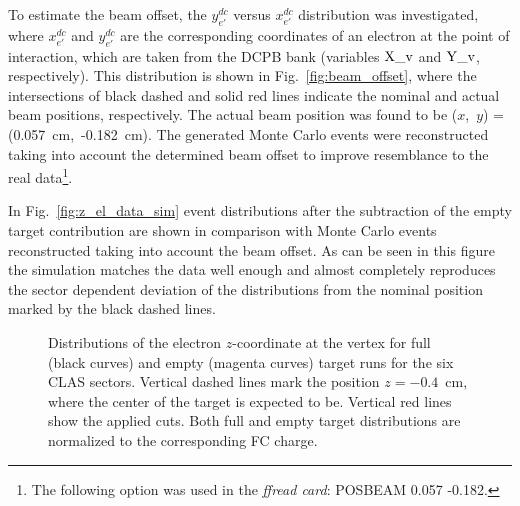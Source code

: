 To estimate the beam offset, the $y_{e'}^{dc}$ versus $x_{e'}^{dc}$ distribution was investigated, where $x_{e'}^{dc}$ and $y_{e'}^{dc}$ are the corresponding coordinates of an electron at the point of interaction, which are taken from the DCPB bank (variables $\rm X\_v$ and $\rm Y\_v$, respectively). This distribution is shown in Fig.~\ref{fig:beam_offset}, where the intersections of black dashed and solid red lines indicate the nominal and actual beam positions, respectively. The actual beam position was found to be ($x$,~$y$) = (0.057~cm,~-0.182~cm). The generated Monte Carlo events were reconstructed taking into account the determined beam offset to improve resemblance to the real data\footnote[7]{The following option was used in the {\em ffread card}: POSBEAM 0.057 -0.182.}.

In Fig.~\ref{fig:z_el_data_sim} event distributions after the subtraction of the empty target contribution are shown in comparison with Monte Carlo events reconstructed taking into account the beam offset. As can be seen in this figure the simulation matches the data well enough and almost completely reproduces the sector dependent deviation of the distributions from the nominal position marked by the black dashed lines.

\afterpage{\clearpage}
\begin{figure}[!ht]
\begin{center}
\end{center}
\caption{\small Distributions of the electron $z$-coordinate at the vertex for full (black curves) and empty (magenta curves) target runs for the six CLAS sectors. Vertical dashed lines mark the position $z = -0.4$~cm, where the center of the target is expected to be. Vertical red lines show the applied cuts. Both full and empty target distributions are normalized to the corresponding FC charge. }
\label{fig:z_el_full_empty}
\end{figure}


